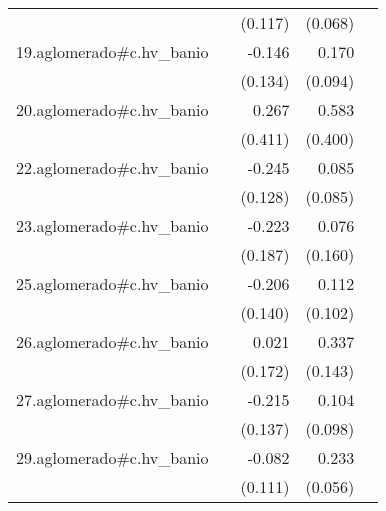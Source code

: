 {\begin{longtable}{l*{4}{D{.}{.}{-1}}}
            &                     &     (0.117)         &     (0.068)         &                     \\
\addlinespace
19.aglomerado#c.hv\_banio&                     &      -0.146         &       0.170         &                     \\
            &                     &     (0.134)         &     (0.094)         &                     \\
\addlinespace
20.aglomerado#c.hv\_banio&                     &       0.267         &       0.583         &                     \\
            &                     &     (0.411)         &     (0.400)         &                     \\
\addlinespace
22.aglomerado#c.hv\_banio&                     &      -0.245         &       0.085         &                     \\
            &                     &     (0.128)         &     (0.085)         &                     \\
\addlinespace
23.aglomerado#c.hv\_banio&                     &      -0.223         &       0.076         &                     \\
            &                     &     (0.187)         &     (0.160)         &                     \\
\addlinespace
25.aglomerado#c.hv\_banio&                     &      -0.206         &       0.112         &                     \\
            &                     &     (0.140)         &     (0.102)         &                     \\
\addlinespace
26.aglomerado#c.hv\_banio&                     &       0.021         &       0.337\sym{*}  &                     \\
            &                     &     (0.172)         &     (0.143)         &                     \\
\addlinespace
27.aglomerado#c.hv\_banio&                     &      -0.215         &       0.104         &                     \\
            &                     &     (0.137)         &     (0.098)         &                     \\
\addlinespace
29.aglomerado#c.hv\_banio&                     &      -0.082         &       0.233\sym{***}&                     \\
            &                     &     (0.111)         &     (0.056)         &                     \\

\end{longtable}}
